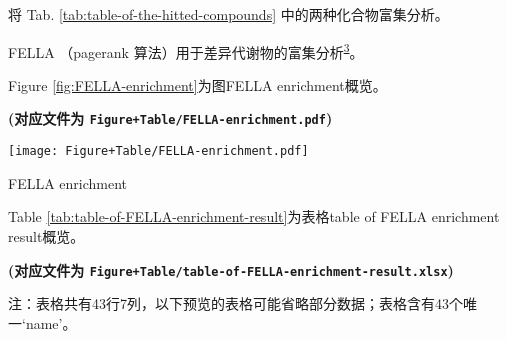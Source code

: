\documentclass[
]{article}
\begin{document}
将 Tab. \ref{tab:table-of-the-hitted-compounds} 中的两种化合物富集分析。

FELLA （pagerank 算法）用于差异代谢物的富集分析\textsuperscript{\protect\hyperlink{ref-FellaAnRPacPicart2018}{3}}。

Figure \ref{fig:FELLA-enrichment}为图FELLA enrichment概览。

\textbf{(对应文件为 \texttt{Figure+Table/FELLA-enrichment.pdf})}

\def\@captype{figure}
\begin{center}
\texttt{[image: Figure+Table/FELLA-enrichment.pdf]}
\caption{FELLA enrichment}\label{fig:FELLA-enrichment}
\end{center}

Table \ref{tab:table-of-FELLA-enrichment-result}为表格table of FELLA enrichment result概览。

\textbf{(对应文件为 \texttt{Figure+Table/table-of-FELLA-enrichment-result.xlsx})}

\begin{center}\begin{tcolorbox}[colback=gray!10, colframe=gray!50, width=0.9\linewidth, arc=1mm, boxrule=0.5pt]注：表格共有43行7列，以下预览的表格可能省略部分数据；表格含有43个唯一`name'。
\end{tcolorbox}
\end{center}
\end{document}
